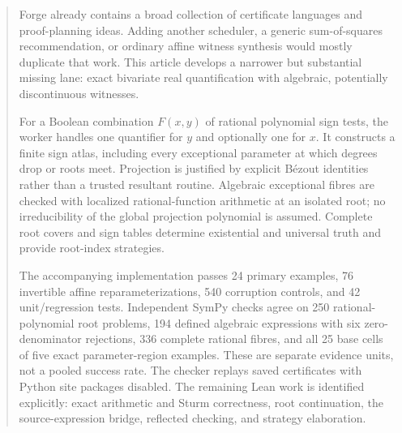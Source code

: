 \documentclass[11pt,a4paper]{article}
\theoremstyle{definition}\newtheorem{definition}[theorem]{Definition}
\theoremstyle{remark}\newtheorem{remark}[theorem]{Remark}
\begin{document}
\begin{abstract}
Forge already contains a broad collection of certificate languages and proof-planning ideas. Adding another scheduler, a generic sum-of-squares recommendation, or ordinary affine witness synthesis would mostly duplicate that work. This article develops a narrower but substantial missing lane: exact bivariate real quantification with algebraic, potentially discontinuous witnesses.

For a Boolean combination $F(x,y)$ of rational polynomial sign tests, the worker handles one quantifier for $y$ and optionally one for $x$. It constructs a finite sign atlas, including every exceptional parameter at which degrees drop or roots meet. Projection is justified by explicit B\'ezout identities rather than a trusted resultant routine. Algebraic exceptional fibres are checked with localized rational-function arithmetic at an isolated root; no irreducibility of the global projection polynomial is assumed. Complete root covers and sign tables determine existential and universal truth and provide root-index strategies.

The accompanying implementation passes 24 primary examples, 76 invertible affine reparameterizations, 540 corruption controls, and 42 unit/regression tests. Independent SymPy checks agree on 250 rational-polynomial root problems, 194 defined algebraic expressions with six zero-denominator rejections, 336 complete rational fibres, and all 25 base cells of five exact parameter-region examples. These are separate evidence units, not a pooled success rate. The checker replays saved certificates with Python site packages disabled. The remaining Lean work is identified explicitly: exact arithmetic and Sturm correctness, root continuation, the source-expression bridge, reflected checking, and strategy elaboration.
\end{abstract}
\begingroup
\setlength{\parskip}{0pt}
\small
\tableofcontents
\endgroup
\clearpage
{}






\appendix


\end{document}
